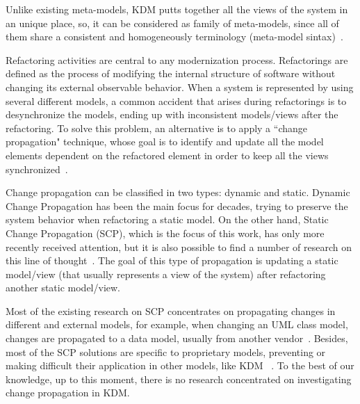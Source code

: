 Unlike existing meta-models, KDM putts together all the  views of the system in an unique place, so, it can be considered as family of meta-models, since all of them share a consistent and homogeneously terminology (meta-model sintax)~\cite{murduck}. %

Refactoring activities are central to any modernization process. Refactorings are defined as the process of modifying the internal structure of software without changing its external observable behavior\cite{refactImpro}. When a system is represented by using several different models, a common accident that arises during refactorings is  to desynchronize the models, ending up with inconsistent models/views after the refactoring. To solve this problem, an alternative is to apply a ``change propagation"  technique, whose goal is to identify and update all the model elements dependent on the refactored element in order to keep all the views synchronized~\cite{4440135, Mens:2006:TMT:1706639.1706924, Mens:2006_NEW, Mens:2007}.

Change propagation can be classified in two types: dynamic and static. Dynamic  Change Propagation has been the main focus for decades, trying to preserve the system behavior when refactoring a static model. On the other hand, Static Change Propagation (SCP), which is the focus of this work, has only more recently received attention, but it is also possible to find a number of research on this line of thought~\cite{4440135, Mens:2006:TMT:1706639.1706924, Mens:2006_NEW, Mens:2007}. The goal of this type of propagation is updating a static model/view (that usually represents a view of the system) after refactoring another static model/view.  

Most of the existing research on SCP concentrates on propagating changes in different and external models, for example, when changing an UML class model, changes are propagated to a data model, usually from another vendor~\cite{Supporting_change_propagation_in_UML_models}. Besides, most of the SCP solutions are specific to proprietary models, preventing or making difficult their application in other models, like KDM ~\cite{4440135, Mens:2007}. To the best of our knowledge, up to this moment, there is no research concentrated on investigating change propagation in KDM.

